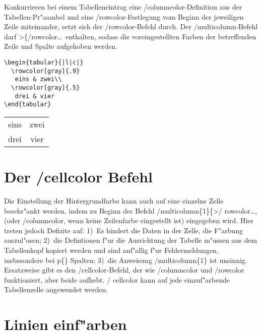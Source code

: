 \documentclass[ngerman]{article}
\begin{document}
Konkurrieren bei einem Tabelleneintrag eine \slash \textsf{columncolor}-Definition aus der
Tabellen-Pr"aambel und eine \slash \textsf{rowcolor}-Festlegung vom Beginn der jeweiligen 
Zeile miteinander, setzt sich der \slash \textsf{rowcolor}-Befehl durch. Der 
\slash \textsf{multicolumn}-Befehl darf >\{\slash \textsf{rowcolor}\ldots\ enthalten, 
sodass die voreingestellten Farben der betreffenden Zeile und Spalte aufgehoben werden.
\begin{center}
\begin{minipage}{.75\textwidth}
\begin{verbatim}
\begin{tabular}{|l|c|}
  \rowcolor[gray]{.9}
   eins & zwei\\
  \rowcolor[gray]{.5}
   drei & vier
\end{tabular}
\end{verbatim}
\end{minipage}
 {\bfseries
  \begin{tabular}{|l|c|}
  \rowcolor[gray]{.9}
  eins & zwei\\
  \rowcolor[gray]{.5}
  drei & vier
  \end{tabular}}
 \end{center}

 \section{Der \slash \textsf{cellcolor} Befehl}

Die Einstellung der Hintergrundfarbe kann auch auf eine einzelne Zelle beschr"ankt werden, 
indem zu Beginn der Befehl \slash \textsf{multicolumn}\{1\}\{>\slash
\textsf{rowcolor}\ldots, (oder
\slash \textsf{columncolor}, wenn keine Zeilenfarbe eingestellt ist) eingegeben wird. Hier treten 
jedoch Defizite auf: 1)~Es hindert die Daten in der Zelle, die F"arbung
auszul"osen; 2)~die Defintionen f"ur die Ausrichtung der Tabelle m"ussen aus dem Tabellenkopf 
kopiert werden und sind anf"allig f"ur Fehlermeldungen, insbesondere bei
p\{\} Spalten; 3)~die Anweisung \slash \textsf{multicolumn}\{1\} ist unsinnig. Ersatzweise gibt es 
den \slash \textsf{cellcolor}-Befehl, der wie \slash \textsf{columncolor}
und \slash \textsf{rowcolor} funktioniert, aber beide aufhebt. \slash
\textsf{cellcolor} kann auf jede einzuf"arbende Tabellenzelle angewendet werden.

\section{Linien einf"arben}
\end{document}
